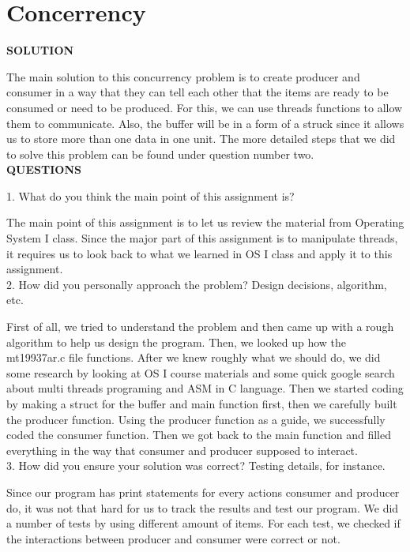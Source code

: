\documentclass[letterpaper,10pt]{article}
\begin{document}
\section*{Concerrency} 
\textbf{SOLUTION}

The main solution to this concurrency problem is to create producer and consumer in a way that they can tell each other that the items are ready to be consumed or need to be produced. For this, we can use threads functions to allow them to communicate. Also, the buffer will be in a form of a struck since it allows us to store more than one data in one unit. The more detailed steps that we did to solve this problem can be found under question number two.\\



\textbf{QUESTIONS}

1.	What do you think the main point of this assignment is?

The main point of this assignment is to let us review the material from Operating System I class. Since the major part of this assignment is to manipulate threads, it requires us to look back to what we learned in OS I class and apply it to this assignment.\\

2.	How did you personally approach the problem? Design decisions, algorithm, etc.

First of all, we tried to understand the problem and then came up with a rough algorithm to help us design the program. Then, we looked up how the mt19937ar.c file functions. After we knew roughly what we should do, we did some research by looking at OS I course materials and some quick google search about multi threads programing and ASM in C language.  Then we started coding by making a struct for the buffer and main function first, then we carefully built the producer function. Using the producer function as a guide, we successfully coded the consumer function. Then we got back to the main function and filled everything in the way that consumer and producer supposed to interact.\\

3.	How did you ensure your solution was correct? Testing details, for instance.

Since our program has print statements for every actions consumer and producer do, it was not that hard for us to track the results and test our program. We did a number of tests by using different amount of items. For each test, we checked if the interactions between producer and consumer were correct or not.\\
\end{document}
